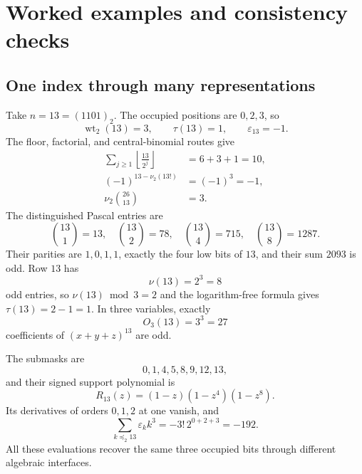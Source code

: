 \documentclass[11pt,oneside]{article}
\numberwithin{equation}{section}
\theoremstyle{definition}
\theoremstyle{remark}
\newcommand{\wt}{\operatorname{wt}_2}
\newcommand{\vtwo}{\nu_2}
\newcommand{\eps}{\varepsilon}
\newcommand{\submask}{\mathrel{\preccurlyeq_2}}
\begin{document}
\section[Worked examples]{Worked examples and consistency checks}
\label{p1:sec:worked-examples}

\subsection{One index through many representations}

Take \(n=13=(1101)_2\).  The occupied positions are \(0,2,3\), so
\begin{equation}
  \wt(13)=3,
  \qquad
  \tau(13)=1,
  \qquad
  \eps_{13}=-1.
  \label{p1:eq:example13-basic}
\end{equation}
The floor, factorial, and central-binomial routes give
\begin{align}
 \sum_{j\ge1}\left\lfloor\frac{13}{2^j}\right\rfloor
 &=6+3+1=10,
 \label{p1:eq:example13-floor}\\
 (-1)^{13-\vtwo(13!)}&=(-1)^3=-1,
 \label{p1:eq:example13-factorial}\\
 \vtwo\binom{26}{13}&=3.
 \label{p1:eq:example13-central}
\end{align}
The distinguished Pascal entries are
\begin{equation}
 \binom{13}{1}=13,
 \quad
 \binom{13}{2}=78,
 \quad
 \binom{13}{4}=715,
 \quad
 \binom{13}{8}=1287.
 \label{p1:eq:example13-probes}
\end{equation}
Their parities are \(1,0,1,1\), exactly the four low bits of \(13\), and their
sum \(2093\) is odd.  Row \(13\) has
\begin{equation}
  \nu(13)=2^3=8
  \label{p1:eq:example13-odd-count}
\end{equation}
odd entries, so \(\nu(13)\bmod3=2\) and the logarithm-free formula gives
\(\tau(13)=2-1=1\).  In three variables, exactly
\begin{equation}
  O_3(13)=3^3=27
  \label{p1:eq:example13-multinomial}
\end{equation}
coefficients of \((x+y+z)^{13}\) are odd.

The submasks are
\begin{equation}
  0,1,4,5,8,9,12,13,
  \label{p1:eq:example13-submasks}
\end{equation}
and their signed support polynomial is
\begin{equation}
  R_{13}(z)=(1-z)(1-z^4)(1-z^8).
  \label{p1:eq:example13-support-product}
\end{equation}
Its derivatives of orders \(0,1,2\) at one vanish, and
\begin{equation}
  \sum_{k\submask13}\eps_kk^3=-3!\,2^{0+2+3}=-192.
  \label{p1:eq:example13-sparse-moment}
\end{equation}
All these evaluations recover the same three occupied bits through different
algebraic interfaces.
\end{document}
